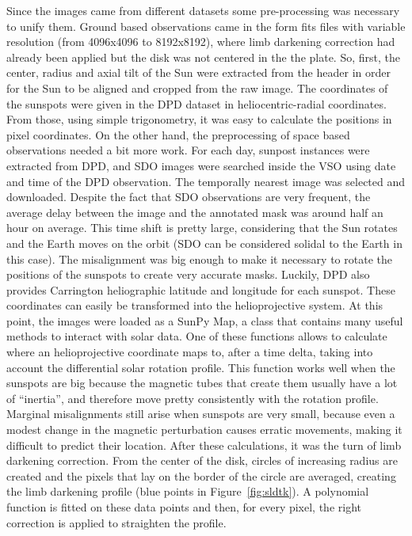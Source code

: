\bigbreak
\noindent Since the images came from different datasets some pre-processing was necessary to unify them. Ground based observations came in the form fits files with variable resolution (from 4096x4096 to 8192x8192), where limb darkening correction had already been applied but the disk was not centered in the the plate. So, first, the center, radius and axial tilt of the Sun were extracted from the header in order for the Sun to be aligned and cropped from the raw image. The coordinates of the sunspots were given in the DPD dataset in heliocentric-radial coordinates. From those, using simple trigonometry, it was easy to calculate the positions in pixel coordinates.
\bigbreak
\noindent On the other hand, the preprocessing of space based observations needed a bit more work. For each day, sunpost instances were extracted from DPD, and SDO images were searched inside the VSO using date and time of the DPD observation. The temporally nearest image was selected and downloaded.
\bigbreak
\noindent Despite the fact that SDO observations are very frequent, the average delay between the image and the annotated mask was around half an hour on average. This time shift is pretty large, considering that the Sun rotates and the Earth moves on the orbit (SDO can be considered solidal to the Earth in this case). The misalignment was big enough to make it necessary to rotate the positions of the sunspots to create very accurate masks. Luckily, DPD also provides Carrington heliographic latitude and longitude for each sunspot. These coordinates can easily be transformed into the helioprojective system. At this point, the images were loaded as a SunPy Map, a class that contains many useful methods to interact with solar data. One of these functions allows to calculate where an helioprojective coordinate maps to, after a time delta, taking into account the differential solar rotation profile.
\bigbreak
\noindent This function works well when the sunspots are big because the magnetic tubes that create them usually have a lot of ``inertia'', and therefore move pretty consistently with the rotation profile. Marginal misalignments still arise when sunspots are very small, because even a modest change in the magnetic perturbation causes erratic movements, making it difficult to predict their location. After these calculations, it was the turn of limb darkening correction. From the center of the disk, circles of increasing radius are created and the pixels that lay on the border of the circle are averaged, creating the limb darkening profile (blue points in Figure~\ref{fig:sldtk}). A polynomial function is fitted on these data points and then, for every pixel, the right correction is applied to straighten the profile.
